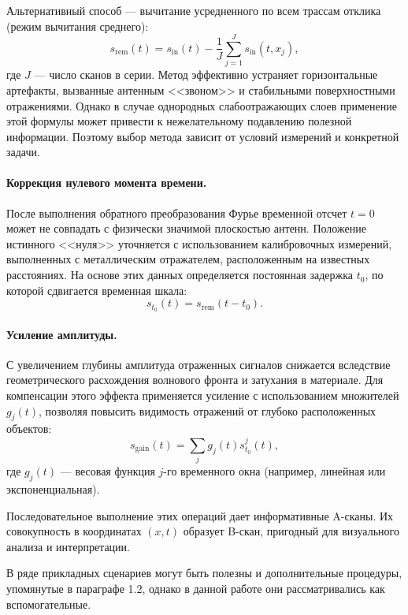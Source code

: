 Альтернативный способ --- вычитание усредненного по всем трассам отклика (режим вычитания среднего):
\begin{equation}
    s_{\mathrm{rem}}(t) = s_{\mathrm{in}}(t) - \frac{1}{J}\sum_{j=1}^{J}s_{\mathrm{in}}(t, x_j),
\end{equation}
где $J$ --- число сканов в серии. Метод эффективно устраняет горизонтальные артефакты, вызванные антенным <<звоном>> и стабильными поверхностными отражениями. Однако в случае однородных слабоотражающих слоев применение этой формулы может привести к нежелательному подавлению полезной информации. Поэтому выбор метода зависит от условий измерений и конкретной задачи.

\paragraph{Коррекция нулевого момента времени.}
После выполнения обратного преобразования Фурье временной отсчет $t = 0$ может не совпадать с физически значимой плоскостью антенн. Положение истинного <<нуля>> уточняется с использованием калибровочных измерений, выполненных с металлическим отражателем, расположенным на известных расстояниях. На основе этих данных определяется постоянная задержка $t_0$, по которой сдвигается временная шкала:
\begin{equation}
    s_{t_0}(t) = s_{\mathrm{rem}}(t - t_0).
\end{equation}

\paragraph{Усиление амплитуды.}
С увеличением глубины амплитуда отраженных сигналов снижается вследствие геометрического расхождения волнового фронта и затухания в материале. Для компенсации этого эффекта применяется усиление с использованием множителей $g_j(t)$, позволяя повысить видимость отражений от глубоко расположенных объектов:
\begin{equation}
    s_{\mathrm{gain}}(t) = \sum_j g_j(t)s_{t_0}^{j}(t),
\end{equation}
где $g_j(t)$ --- весовая функция $j$-го временного окна (например, линейная или экспоненциальная).

Последовательное выполнение этих операций дает информативные A-сканы. Их совокупность в координатах $(x, t)$ образует B-скан, пригодный для визуального анализа и интерпретации.

В ряде прикладных сценариев могут быть полезны и дополнительные процедуры, упомянутые в параграфе 1.2, однако в данной работе они рассматривались как вспомогательные.
